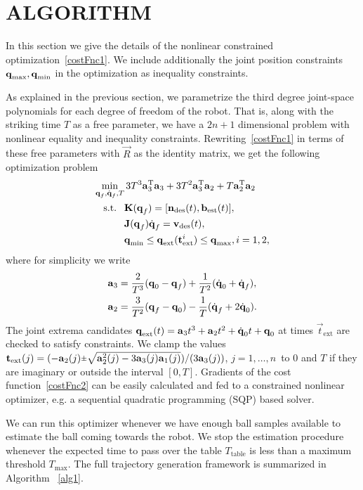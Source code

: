 \section{ALGORITHM}\label{alg}

In this section we give the details of the nonlinear constrained optimization~\eqref{costFnc1}. We include additionally the joint position constraints $\boldsymbol{\mathrm{q}}_{\mathrm{max}}, \boldsymbol{\mathrm{q}}_{\mathrm{min}}$ in the optimization as inequality constraints. 

As explained in the previous section, we parametrize the third degree joint-space polynomials for each degree of freedom of the robot. That is, along with the striking time $T$ as a free parameter, we have a $2n+1$ dimensional problem with nonlinear equality and inequality constraints. Rewriting~\eqref{costFnc1} in terms of these free parameters with $\vec{R}$ as the identity matrix, we get the following optimization problem
%
\begin{align}
\min_{\boldsymbol{\mathrm{q}}_f,\dot{\boldsymbol{\mathrm{q}}}_f, T} & \, 3T^3 \boldsymbol{\mathrm{a}}_3^{\mathrm{T}}\boldsymbol{\mathrm{a}}_3 + 3T^2 \boldsymbol{\mathrm{a}}_3^{\mathrm{T}}\boldsymbol{\mathrm{a}}_2 + T\boldsymbol{\mathrm{a}}_2^{\mathrm{T}}\boldsymbol{\mathrm{a}}_2 \label{costFnc2} \\
\textrm{s.t. \ } & \boldsymbol{\mathrm{K}}(\boldsymbol{\mathrm{q}}_f) = [\boldsymbol{\mathrm{n}}_{\mathrm{des}}(t),\boldsymbol{\mathrm{b}}_{\mathrm{est}}(t)], \\
&\boldsymbol{\mathrm{J}}(\boldsymbol{\mathrm{q}}_f)\dot{\boldsymbol{\mathrm{q}}}_f = \boldsymbol{\mathrm{v}}_{\mathrm{des}}(t), \\
& \boldsymbol{\mathrm{q}}_{\mathrm{min}} \leq \boldsymbol{\mathrm{q}}_{\mathrm{ext}}(\boldsymbol{\mathrm{t}}_{\mathrm{ext}}^{i}) \leq \boldsymbol{\mathrm{q}}_{\mathrm{max}}, i = 1,2,
\end{align}
%
\noindent where for simplicity we write 
%
\begin{align}
\boldsymbol{\mathrm{a}}_3 &= \frac{2}{T^3}(\boldsymbol{\mathrm{q}}_0 - \boldsymbol{\mathrm{q}}_f) + \frac{1}{T^2}(\dot{\boldsymbol{\mathrm{q}}}_0 + \dot{\boldsymbol{\mathrm{q}}}_f), \\
\boldsymbol{\mathrm{a}}_2 &= \frac{3}{T^2}(\boldsymbol{\mathrm{q}}_f - \boldsymbol{\mathrm{q}}_0) - \frac{1}{T}(\dot{\boldsymbol{\mathrm{q}}}_f + 2\dot{\boldsymbol{\mathrm{q}}}_0).
\end{align}
%
The joint extrema candidates $\boldsymbol{\mathrm{q}}_{\mathrm{ext}}(t) = \boldsymbol{\mathrm{a}}_3 t^3  + \boldsymbol{\mathrm{a}}_2 t^2 + \dot{\boldsymbol{\mathrm{q}}}_0 t + \boldsymbol{\mathrm{q}}_0$ at times $\vec{t}_{\mathrm{ext}}$ are checked to satisfy constraints. We clamp the values $\vec{t}_{\mathrm{ext}}(j) = (-\vec{a}_2(j) \rpm \sqrt{\vec{a}_2^2(j) - 3\vec{a}_3(j)\vec{a}_1(j)})/(3\vec{a}_3(j))$, $j = 1, \ldots, n \,$ to $0$ and $T$ if they are imaginary or outside the interval $[0,T]$. Gradients of the cost function~\eqref{costFnc2} can be easily calculated and fed to a constrained nonlinear optimizer, e.g. a sequential quadratic programming (SQP) based solver. 

We can run this optimizer whenever we have enough ball samples available to estimate the ball coming towards the robot. We stop the estimation procedure whenever the expected time to pass over the table $T_{\mathrm{table}}$ is less than a maximum threshold $T_{\mathrm{max}}$. The full trajectory generation framework is summarized in Algorithm ~\ref{alg1}.

